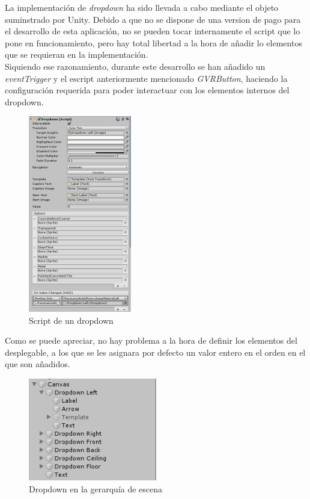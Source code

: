 \quad La implementación de \textit{dropdown} ha sido llevada a cabo mediante el objeto suminstrado por Unity. Debido a que no se dispone de una version de pago para el desarrollo de esta aplicación, no se pueden tocar internamente el script que lo pone en funcionamiento, pero hay total libertad a la hora de añadir lo elementos que se requieran en la implementación.\\

\quad Siquiendo ese razonamiento, durante este desarrollo se han añadido un \textit{eventTrigger} y el escript anteriormente mencionado \textit{GVRButton}, haciendo la configuración requerida para poder interactuar con los elementos internos del dropdown.\\

\begin{figure}[htb]
	\centering
	\includegraphics[width=0.4\textwidth]{./imagenes/dropDownScriptUnity}
	\caption{Script de un dropdown}
\end{figure}

\newpage
\quad Como se puede apreciar, no hay problema a la hora de definir los elementos del desplegable, a los que se les asignara por defecto un valor entero en el orden en el que son añadidos.\\ 

\begin{figure}[htb]
	\centering
	\includegraphics[width=0.5\textwidth]{./imagenes/dropdown}
	\caption{Dropdown en la gerarquía de escena}
\end{figure}


